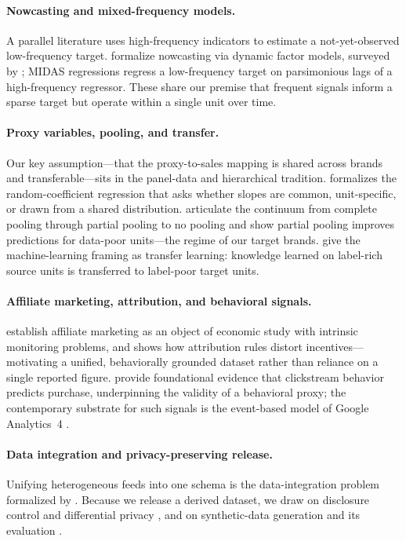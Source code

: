 \documentclass[11pt]{article}
\begin{document}
\paragraph{Nowcasting and mixed-frequency models.}
A parallel literature uses high-frequency indicators to estimate a
not-yet-observed low-frequency target. \citet{GiannoneReichlinSmall2008}
formalize nowcasting via dynamic factor models, surveyed by
\citet{Banbura2013Nowcasting}; MIDAS regressions
\citep{GhyselsSantaClaraValkanov2006,GhyselsSinkoValkanov2007} regress a
low-frequency target on parsimonious lags of a high-frequency regressor. These
share our premise that frequent signals inform a sparse target but operate
within a single unit over time.

\paragraph{Proxy variables, pooling, and transfer.}
Our key assumption---that the proxy-to-sales mapping is shared across brands and
transferable---sits in the panel-data and hierarchical tradition.
\citet{Swamy1970} formalizes the random-coefficient regression that asks whether
slopes are common, unit-specific, or drawn from a shared distribution.
\citet{GelmanHill2006} articulate the continuum from complete pooling through
partial pooling to no pooling and show partial pooling improves predictions for
data-poor units---the regime of our target brands. \citet{PanYang2010} give the
machine-learning framing as transfer learning: knowledge learned on
label-rich source units is transferred to label-poor target units.

\paragraph{Affiliate marketing, attribution, and behavioral signals.}
\citet{EdelmanBrandi2015} establish affiliate marketing as an object of
economic study with intrinsic monitoring problems, and \citet{Berman2018} shows
how attribution rules distort incentives---motivating a unified, behaviorally
grounded dataset rather than reliance on a single reported figure.
\citet{MoeFader2004} provide foundational evidence that clickstream behavior
predicts purchase, underpinning the validity of a behavioral proxy; the
contemporary substrate for such signals is the event-based model of Google
Analytics~4 \citep{GA4Docs2023}.

\paragraph{Data integration and privacy-preserving release.}
Unifying heterogeneous feeds into one schema is the data-integration problem
formalized by \citet{Lenzerini2002}. Because we release a derived dataset, we
draw on disclosure control \citep{Hundepool2012} and differential privacy
\citep{DworkMcSherryNissimSmith2006,DworkRoth2014}, and on synthetic-data
generation and its evaluation \citep{FigueiraVaz2022,Hernandez2022}.
\end{document}

